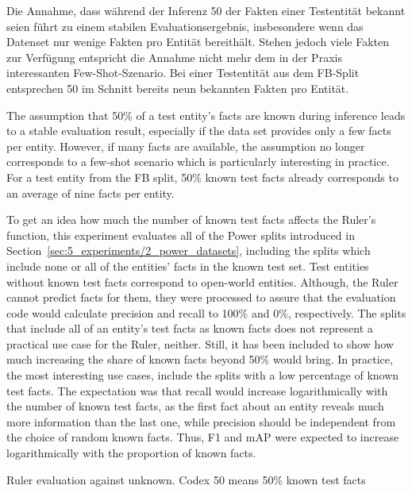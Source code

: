 Die Annahme, dass während der Inferenz 50 der Fakten einer Testentität bekannt seien führt zu einem stabilen Evaluationsergebnis, insbesondere wenn das Datenset nur wenige Fakten pro Entität bereithält. Stehen jedoch viele Fakten zur Verfügung entspricht die Annahme nicht mehr dem in der Praxis interessanten Few-Shot-Szenario. Bei einer Testentität aus dem FB-Split entsprechen 50 im Schnitt bereits neun bekannten Fakten pro Entität.

The assumption that 50\% of a test entity's facts are known during inference leads to a stable evaluation result, especially if the data set provides only a few facts per entity. However, if many facts are available, the assumption no longer corresponds to a few-shot scenario which is particularly interesting in practice. For a test entity from the FB split, 50\% known test facts already corresponds to an average of nine facts per entity.

To get an idea how much the number of known test facts affects the Ruler's function, this experiment evaluates all of the Power splits introduced in Section~\ref{sec:5_experiments/2_power_datasets}, including the splits which include none or all of the entities' facts in the known test set. Test entities without known test facts correspond to open-world entities. Although, the Ruler cannot predict facts for them, they were processed to assure that the evaluation code would calculate precision and recall to 100\% and 0\%, respectively. The splits that include all of an entity's test facts as known facts does not represent a practical use case for the Ruler, neither. Still, it has been included to show how much increasing the share of known facts beyond 50\% would bring. In practice, the most interesting use cases, include the splits with a low percentage of known test facts. The expectation was that recall would increase logarithmically with the number of known test facts, as the first fact about an entity reveals much more information than the last one, while precision should be independent from the choice of random known facts. Thus, F1 and mAP were expected to increase logarithmically with the proportion of known facts.

\begin{table}
    \centering
    
    \caption{Ruler evaluation against unknown. Codex 50 means 50\% known test facts}
    \label{tab:5_experiments/5_ruler/1_unknown/all_results}
\end{table}

